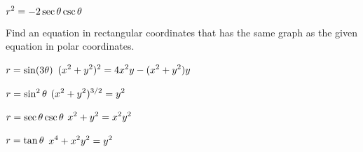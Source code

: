 \exercise $\displaystyle r^2=-2\sec\theta\csc\theta$

\endtwocol

\bigbreak
\noindent Find an equation in rectangular coordinates that has the same
graph as the given equation in polar coordinates.

\twocol
\endexercise

\exercise $\displaystyle r=\sin(3\theta)$
\answer $\displaystyle (x^2+y^2)^2=4x^2y-(x^2+y^2)y$
\endanswer
\endexercise

\exercise $\displaystyle r=\sin^2\theta$
\answer $\displaystyle (x^2+y^2)^{3/2}=y^2$
\endanswer
\endexercise

\exercise $\displaystyle r=\sec\theta\csc\theta$
\answer $\displaystyle x^2+y^2=x^2y^2$
\endanswer
\endexercise

\exercise $\displaystyle r=\tan\theta$
\answer $\displaystyle x^4+x^2y^2=y^2$
\endanswer

\endtwocol
\endexercise

\endexercises
